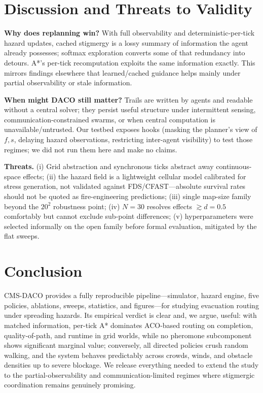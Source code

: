 \documentclass[conference]{IEEEtran}
\begin{document}
\section{Discussion and Threats to Validity}
\textbf{Why does replanning win?} With full observability and deterministic-per-tick hazard updates, cached stigmergy is a lossy summary of information the agent already possesses; softmax exploration converts some of that redundancy into detours. A*'s per-tick recomputation exploits the same information exactly. This mirrors findings elsewhere that learned/cached guidance helps mainly under partial observability or stale information.

\textbf{When might DACO still matter?} Trails are written by agents and readable without a central solver; they persist useful structure under intermittent sensing, communication-constrained swarms, or when central computation is unavailable/untrusted. Our testbed exposes hooks (masking the planner's view of $f,s$, delaying hazard observations, restricting inter-agent visibility) to test those regimes; we did not run them here and make no claims.

\textbf{Threats.} (i) Grid abstraction and synchronous ticks abstract away continuous-space effects; (ii) the hazard field is a lightweight cellular model calibrated for stress generation, not validated against FDS/CFAST---absolute survival rates should not be quoted as fire-engineering predictions; (iii) single map-size family beyond the $20^2$ robustness point; (iv) $N{=}30$ resolves effects $\gtrsim d{=}0.5$ comfortably but cannot exclude sub-point differences; (v) hyperparameters were selected informally on the open family before formal evaluation, mitigated by the flat sweeps.

\section{Conclusion}
CMS-DACO provides a fully reproducible pipeline---simulator, hazard engine, five policies, ablations, sweeps, statistics, and figures---for studying evacuation routing under spreading hazards. Its empirical verdict is clear and, we argue, useful: with matched information, per-tick A* dominates ACO-based routing on completion, quality-of-path, and runtime in grid worlds, while no pheromone subcomponent shows significant marginal value; conversely, all directed policies crush random walking, and the system behaves predictably across crowds, winds, and obstacle densities up to severe blockage. We release everything needed to extend the study to the partial-observability and communication-limited regimes where stigmergic coordination remains genuinely promising.
\end{document}
